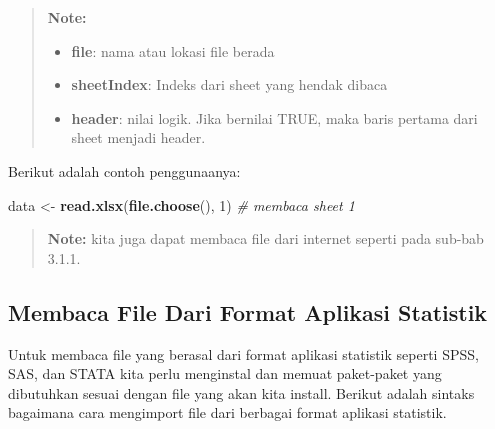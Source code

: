 \documentclass[]{book}
\newenvironment{Shaded}{\begin{snugshade}}{\end{snugshade}}
\newcommand{\KeywordTok}[1]{\textcolor[rgb]{0.13,0.29,0.53}{\textbf{#1}}}
\newcommand{\DecValTok}[1]{\textcolor[rgb]{0.00,0.00,0.81}{#1}}
\newcommand{\StringTok}[1]{\textcolor[rgb]{0.31,0.60,0.02}{#1}}
\newcommand{\CommentTok}[1]{\textcolor[rgb]{0.56,0.35,0.01}{\textit{#1}}}
\newcommand{\NormalTok}[1]{#1}
\providecommand{\tightlist}{%
  \setlength{\itemsep}{0pt}\setlength{\parskip}{0pt}}
\begin{document}
\begin{quote}
\textbf{Note: }

\begin{itemize}
\tightlist
\item
  \textbf{file}: nama atau lokasi file berada
\item
  \textbf{sheetIndex}: Indeks dari sheet yang hendak dibaca
\item
  \textbf{header}: nilai logik. Jika bernilai TRUE, maka baris pertama
  dari sheet menjadi header.
\end{itemize}
\end{quote}

Berikut adalah contoh penggunaanya:

\begin{Shaded}
\begin{Highlighting}[]
\NormalTok{data <-}\StringTok{ }\KeywordTok{read.xlsx}\NormalTok{(}\KeywordTok{file.choose}\NormalTok{(), }\DecValTok{1}\NormalTok{) }\CommentTok{# membaca sheet 1}
\end{Highlighting}
\end{Shaded}

\begin{quote}
\textbf{Note: } kita juga dapat membaca file dari internet seperti pada
sub-bab 3.1.1.
\end{quote}

\subsection{Membaca File Dari Format Aplikasi
Statistik}\label{membaca-file-dari-format-aplikasi-statistik}

Untuk membaca file yang berasal dari format aplikasi statistik seperti
SPSS, SAS, dan STATA kita perlu menginstal dan memuat paket-paket yang
dibutuhkan sesuai dengan file yang akan kita install. Berikut adalah
sintaks bagaimana cara mengimport file dari berbagai format aplikasi
statistik.
\end{document}
